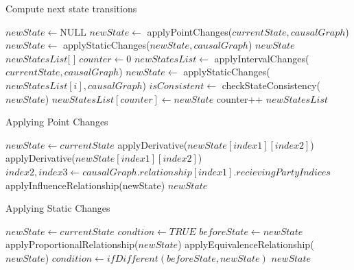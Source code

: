 \documentclass{article}
\begin{document}
\begin{algorithm}
	\caption{Compute next state transitions}\label{nextstate}
	\begin{algorithmic}[1]
		\State $newState \gets \text{NULL}$ 
		\State $newState \gets$ applyPointChanges($currentState,causalGraph$)
		\State $newState \gets$ applyStaticChanges($newState,causalGraph$)
		\State \Return $newState$
		\EndIf
		\State $newStatesList$[ ]
		\State $counter \gets 0$
		\State $newStatesList \gets$ applyIntervalChanges($currentState,causalGraph$)
		\State $newState \gets$ applyStaticChanges($newStatesList[i],causalGraph$)
		\State $isConsistent \gets$ checkStateConsistency($newState$)
		\State $newStatesList[counter] \gets newState$
		\State counter++
		\EndIf
		\EndFor
		\State \Return $newStatesList$
		\EndProcedure
	\end{algorithmic}
\end{algorithm}

\begin{algorithm}
	\caption{Applying Point Changes}\label{pointchanges}
	\begin{algorithmic}[1]
		\State $newState \gets currentState$
		\State applyDerivative($newState[index1][index2]$)
		\EndIf
		\State applyDerivative($newState[index1][index2]$)
		\EndIf
		\EndIf
		\EndFor
		\EndFor
		\State $index2,index3 \gets causalGraph.relationship[index1].recievingPartyIndices$
		\State applyInfluenceRelationship(newState)
		\EndIf
		\EndIf
		\EndFor
		\State \Return $newState$
		\EndProcedure
	\end{algorithmic}
\end{algorithm}

\begin{algorithm}
	\caption{Applying Static Changes}\label{staticchanges}
	\begin{algorithmic}[1]
		\State $newState \gets currentState$
		\State $condtion \gets TRUE$
		\State $beforeState \gets newState$
		\State applyProportionalRelationship($newState$)
		\EndIf
		\State applyEquivalenceRelationship($newState$)
		\EndIf
		\State $condition \gets ifDifferent(beforeState,newState)$
		\EndFor
		\EndWhile
		\State \Return $newState$
		\EndProcedure
	\end{algorithmic}
\end{algorithm}
\end{document}
